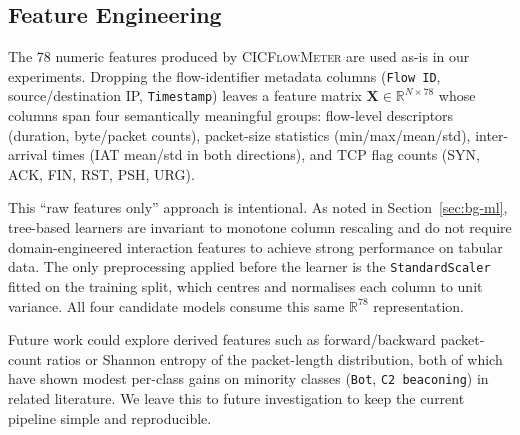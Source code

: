 \subsection{Feature Engineering}
\label{sec:feat-eng}

The 78 numeric features produced by \textsc{CICFlowMeter} are used as-is in our experiments. Dropping the flow-identifier metadata columns (\texttt{Flow ID}, source/destination IP, \texttt{Timestamp}) leaves a feature matrix $\mathbf{X} \in \mathbb{R}^{N \times 78}$ whose columns span four semantically meaningful groups: flow-level descriptors (duration, byte/packet counts), packet-size statistics (min/max/mean/std), inter-arrival times (IAT mean/std in both directions), and TCP flag counts (SYN, ACK, FIN, RST, PSH, URG).

This ``raw features only'' approach is intentional. As noted in Section~\ref{sec:bg-ml}, tree-based learners are invariant to monotone column rescaling and do not require domain-engineered interaction features to achieve strong performance on tabular data. The only preprocessing applied before the learner is the \texttt{StandardScaler} fitted on the training split, which centres and normalises each column to unit variance. All four candidate models consume this same $\mathbb{R}^{78}$ representation.

Future work could explore derived features such as forward/backward packet-count ratios or Shannon entropy of the packet-length distribution, both of which have shown modest per-class gains on minority classes (\texttt{Bot}, \texttt{C2 beaconing}) in related literature. We leave this to future investigation to keep the current pipeline simple and reproducible.
